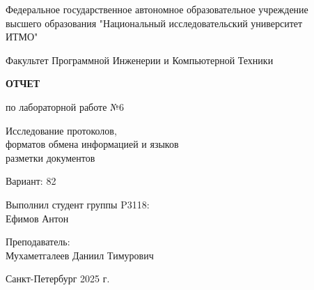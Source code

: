 \documentclass[a4paper,12pt]{article}
\begin{document}
\begin{titlepage}
    \centering 

    {\small
    Федеральное государственное автономное образовательное учреждение\\
    высшего образования "Национальный исследовательский университет\\
    ИТМО"\par}
    
    \vspace{1cm} 
    
    {\small
    Факультет Программной Инженерии и Компьютерной Техники\par}

    \vspace{4cm} 

    {\bfseries\Huge ОТЧЕТ\par}
    
    \vspace{0.5cm}
    
    {\Large по лабораторной работе №6\par}
    
    \vspace{1cm}
    
    {\Large 
    Исследование протоколов,\\
    форматов обмена информацией и языков\\
    разметки документов\par}
    
    \vspace{1cm}
    
    {\Large Вариант: 82\par}

    \vfill 
    \hfill
    \begin{minipage}{0.5\textwidth}
        \raggedleft 
        
        Выполнил студент группы P3118:\\
        \vspace{0.2cm}
        Ефимов Антон\\
        
        \vspace{0.5cm}
        
        Преподаватель:\\
        \vspace{0.2cm}
        Мухаметгалеев Даниил Тимурович
    \end{minipage}

    \vfill 

    Санкт-Петербург 2025 г.

\end{titlepage}
\end{document}
